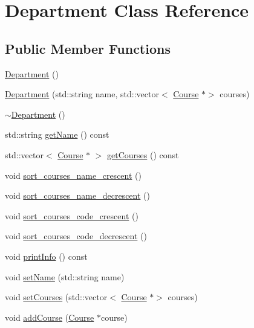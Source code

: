 \hypertarget{classDepartment}{}\section{Department Class Reference}
\label{classDepartment}
\subsection*{Public Member Functions}
\begin{DoxyCompactItemize}
\item 
\hyperlink{classDepartment_a9d85b4973d29f519e09fdafa53a56e8c}{Department} ()
\item 
\hyperlink{classDepartment_a75a594311b114c794be126f5e2cd6a2d}{Department} (std\+::string name, std\+::vector$<$ \hyperlink{classCourse}{Course} $\ast$$>$ courses)
\item 
\hyperlink{classDepartment_a15f5619c6679ffc80fe6de41c7a2e4a1}{$\sim$\+Department} ()
\item 
std\+::string \hyperlink{classDepartment_a3ada89e70eae97b429c9a82f601e98c0}{get\+Name} () const
\item 
std\+::vector$<$ \hyperlink{classCourse}{Course} $\ast$ $>$ \hyperlink{classDepartment_a1a350298618bf4be8cc42eabef377212}{get\+Courses} () const
\item 
void \hyperlink{classDepartment_a020f24af6978f0033895e8ebde27bbfb}{sort\+\_\+courses\+\_\+name\+\_\+crescent} ()
\item 
void \hyperlink{classDepartment_a7798d17dd46c0859cf6ce68c7ec434ae}{sort\+\_\+courses\+\_\+name\+\_\+decrescent} ()
\item 
void \hyperlink{classDepartment_accf36d58f8b5e8110148f3a69ad30278}{sort\+\_\+courses\+\_\+code\+\_\+crescent} ()
\item 
void \hyperlink{classDepartment_a320c23411a02eba00f00a15895c538b2}{sort\+\_\+courses\+\_\+code\+\_\+decrescent} ()
\item 
void \hyperlink{classDepartment_ab15a7312cdf65f53c3796c428bb6211b}{print\+Info} () const
\item 
void \hyperlink{classDepartment_adbde303b8c83a10b3da68ee9f949f731}{set\+Name} (std\+::string name)
\item 
void \hyperlink{classDepartment_a52742b6ce155016eb084ccd2faccdeef}{set\+Courses} (std\+::vector$<$ \hyperlink{classCourse}{Course} $\ast$$>$ courses)
\item 
void \hyperlink{classDepartment_a93ca2b0446a426603f62786693c57b47}{add\+Course} (\hyperlink{classCourse}{Course} $\ast$course)

\end{DoxyCompactItemize}
